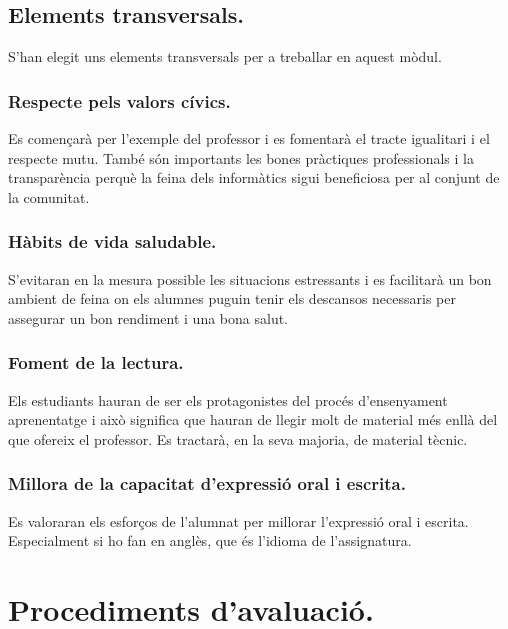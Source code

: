\documentclass[catalan, a4paper, 12pt, titlepage]{article}
\begin{document}
\subsection{Elements transversals.}

S'han elegit uns elements transversals per a treballar en aquest mòdul.

\subsubsection{Respecte pels valors cívics.}

Es començarà per l'exemple del professor i es fomentarà el tracte igualitari i el respecte mutu. També són importants les bones pràctiques professionals i la transparència perquè la feina dels informàtics sigui beneficiosa per al conjunt de la comunitat.

\subsubsection{Hàbits de vida saludable.}

S'evitaran en la mesura possible les situacions estressants i es facilitarà un bon ambient de feina on els alumnes puguin tenir els descansos necessaris per assegurar un bon rendiment i una bona salut.

\subsubsection{Foment de la lectura.}

Els estudiants hauran de ser els protagonistes del procés d'ensenyament aprenentatge i això significa que hauran de llegir molt de material més enllà del que ofereix el professor. Es tractarà, en la seva majoria, de material tècnic.

\subsubsection{Millora de la capacitat d'expressió oral i escrita.}

Es valoraran els esforços de l'alumnat per millorar l'expressió oral i escrita. Especialment si ho fan en anglès, que és l'idioma de l'assignatura.

\section{Procediments d'avaluació.}
\label{sec:procediments}
\end{document}
